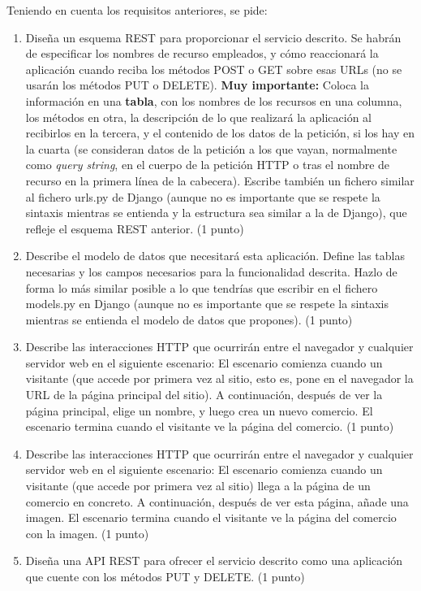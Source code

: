\newpage

Teniendo en cuenta los requisitos anteriores, se pide:

\begin{enumerate}
  \item Diseña un esquema REST para proporcionar el servicio descrito. Se habrán de especificar los nombres de recurso empleados, y cómo reaccionará la aplicación cuando reciba los métodos POST o GET sobre esas URLs (no se usarán los métodos PUT o DELETE). \textbf{Muy importante:} Coloca la información en una \textbf{tabla}, con los nombres de los recursos en una columna, los métodos en otra, la descripción de lo que realizará la aplicación al recibirlos en la tercera, y el contenido de los datos de la petición, si los hay en la cuarta (se consideran datos de la petición a los que vayan, normalmente como \emph{query string}, en el cuerpo de la petición HTTP o tras el nombre de recurso en la primera línea de la cabecera). Escribe también un fichero similar al fichero urls.py de Django (aunque no es importante que se respete la sintaxis mientras se entienda y la estructura sea similar a la de Django), que refleje el esquema REST anterior. (1 punto)

  \item Describe el modelo de datos que necesitará esta aplicación. Define las tablas necesarias y los campos necesarios para la funcionalidad descrita. Hazlo de forma lo más similar posible a lo que tendrías que escribir en el fichero models.py en Django (aunque no es importante que se respete la sintaxis mientras se entienda el modelo de datos que propones). (1 punto)

  \item Describe las interacciones HTTP que ocurrirán entre el navegador y cualquier servidor web en el siguiente escenario: El escenario comienza cuando un visitante (que accede por primera vez al sitio, esto es, pone en el navegador la URL de la página principal del sitio). A continuación, después de ver la página principal, elige un nombre, y luego crea un nuevo comercio. El escenario termina cuando el visitante ve la página del comercio. (1 punto)

  \item Describe las interacciones HTTP que ocurrirán entre el navegador y cualquier servidor web en el siguiente escenario: El escenario comienza cuando un visitante (que accede por primera vez al sitio) llega a la página de un comercio en concreto. A continuación, después de ver esta página, añade una imagen. El escenario termina cuando el visitante ve la página del comercio con la imagen. (1 punto)

  \item Diseña una API REST para ofrecer el servicio descrito como una aplicación que cuente con los métodos PUT y DELETE. (1 punto)

\end{enumerate}

